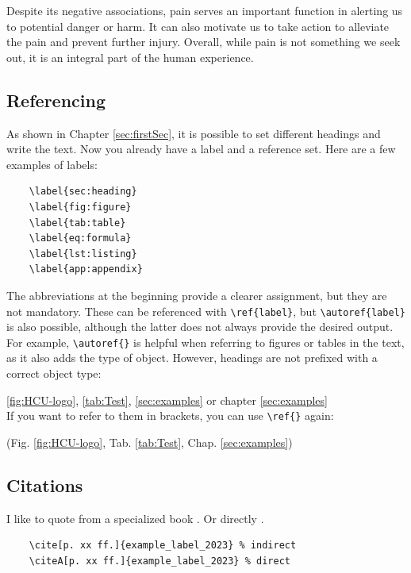 Despite its negative associations, pain serves an important function in alerting us to potential danger or harm. It can also motivate us to take action to alleviate the pain and prevent further injury. Overall, while pain is not something we seek out, it is an integral part of the human experience.


\subsection{Referencing}

As shown in Chapter \ref{sec:firstSec}, it is possible to set different headings and write the text. Now you already have a label and a reference set. Here are a few examples of labels:

\begin{verbatim}
    \label{sec:heading}
    \label{fig:figure}
    \label{tab:table}
    \label{eq:formula}
    \label{lst:listing}
    \label{app:appendix}
\end{verbatim}

The abbreviations at the beginning provide a clearer assignment, but they are not mandatory. These can be referenced with \verb|\ref{label}|, but \verb|\autoref{label}| is also possible, although the latter does not always provide the desired output. For example, \verb|\autoref{}| is helpful when referring to figures or tables in the text, as it also adds the type of object. However, headings are not prefixed with a correct object type:

\autoref{fig:HCU-logo}, \autoref{tab:Test}, \autoref{sec:examples} or chapter \ref{sec:examples}\\

If you want to refer to them in brackets, you can use \verb|\ref{}| again:

(Fig. \ref{fig:HCU-logo}, Tab. \ref{tab:Test}, Chap. \ref{sec:examples})


\subsection{Citations} \label{sec:Citations}

I like to quote from a specialized book \cite[p. xx ff.]{9783879076581}. Or directly .

\begin{verbatim}
    \cite[p. xx ff.]{example_label_2023} % indirect
    \citeA[p. xx ff.]{example_label_2023} % direct
\end{verbatim}

